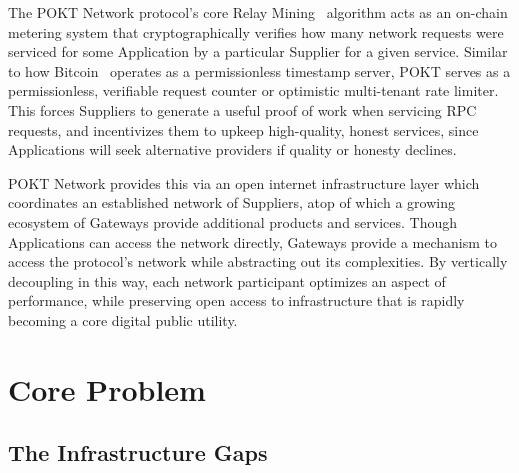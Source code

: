 \documentclass[conference,compsoc]{IEEEtran}
\begin{document}
The POKT Network protocol's core Relay Mining~\cite{olshansky2023relay} algorithm acts as an on-chain metering system that cryptographically verifies how many network requests were serviced for some Application by a particular Supplier for a given service. Similar to how Bitcoin~\cite{nakamoto2008bitcoin} operates as a permissionless timestamp server, POKT serves as a permissionless, verifiable request counter or optimistic multi-tenant rate limiter. This forces Suppliers to generate a useful proof of work when servicing RPC requests, and incentivizes them to upkeep high-quality, honest services, since Applications will seek alternative providers if quality or honesty declines.

POKT Network provides this via an open internet infrastructure layer which coordinates an established network of Suppliers, atop of which a growing ecosystem of Gateways provide additional products and services. Though Applications can access the network directly, Gateways provide a mechanism to access the protocol's network while abstracting out its complexities. By vertically decoupling in this way, each network participant optimizes an aspect of performance, while preserving open access to infrastructure that is rapidly becoming a core digital public utility. 

\section{Core Problem}

\subsection{The Infrastructure Gaps}
\end{document}
